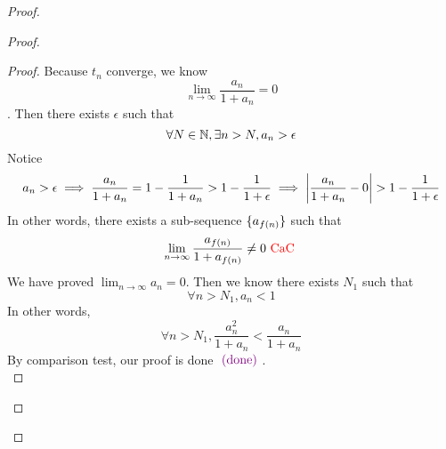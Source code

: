 \documentclass{report}
\begin{document}
\begin{proof}
\begin{proof}
\begin{proof}
Because $t_n$ converge, we know 
 \begin{equation}
\lim_{n\to\infty}\frac{a_n}{1+a_n}=0
\end{equation}
. Then there exists $\epsilon $ such that
\begin{equation}
\forall N\in\mathbb{N}, \exists n>N, a_n>\epsilon 
\end{equation}
Notice
\begin{equation}
a_n>\epsilon \implies \frac{a_n}{1+a_n}=1-\frac{1}{1+a_n}>1-\frac{1}{1+\epsilon }\implies \abso{\frac{a_n}{1+a_n}-0}>1-\frac{1}{1+\epsilon }
\end{equation}
In other words, there exists a sub-sequence $\{ a_{f(n)} \}$ such that
\begin{equation}
\lim_{n\to\infty}\frac{a_{f(n)}}{1+a_{f(n)}}\neq 0\text{ \textcolor{red}{CaC} }
\end{equation}
We have proved $\lim_{n\to\infty}a_n=0$. Then we know there exists $N_1$ such that
 \begin{equation}
\forall n>N_1, a_n<1
\end{equation}
In other words,
\begin{equation}
\forall n>N_1, \frac{a_n^2}{1+a_n}<\frac{a_n}{1+a_n}
\end{equation}
By comparison test, our proof is done $\textcolor{violet}{\text{ (done) }}$.\\


\end{proof}
\end{proof}
\end{proof}
\end{document}
